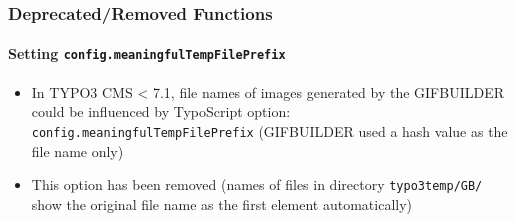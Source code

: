 
\begin{frame}[fragile]
	\frametitle{Deprecated/Removed Functions}
	\framesubtitle{Setting \texttt{config.meaningfulTempFilePrefix}}

	\begin{itemize}

		\item In TYPO3 CMS < 7.1, file names of images generated by the GIFBUILDER could be
			influenced by TypoScript option:\newline
			\texttt{config.meaningfulTempFilePrefix}\newline
			\small
				(GIFBUILDER used a hash value as the file name only)
			\normalsize

		\item This option has been removed (names of files in directory \texttt{typo3temp/GB/}
			show the original file name as the first element automatically)

	\end{itemize}

\end{frame}




